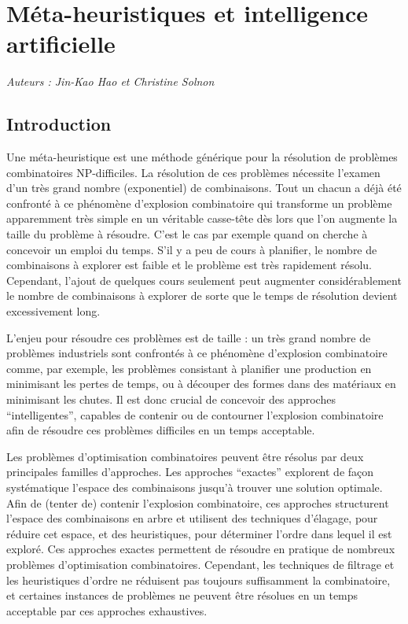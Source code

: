 \documentclass[12pt,a4paper]{book}
\begin{document}
\chapter{Méta-heuristiques et intelligence artificielle}
\textit{Auteurs : Jin-Kao Hao et Christine Solnon}

\section{Introduction}
\label{sec:intro}

Une méta-heuristique est une méthode générique pour la résolution de problèmes combinatoires NP-difficiles. La résolution de ces problèmes nécessite l'examen d'un très grand nombre (exponentiel) de combinaisons. Tout un chacun a déjà été confronté à ce phénomène d'explosion combinatoire qui transforme un problème apparemment très simple en un véritable casse-tête dès lors que l'on augmente la taille du problème à résoudre. C'est le cas par exemple quand on cherche à concevoir un emploi du temps. S'il y a peu de cours à planifier, le nombre de combinaisons à explorer est faible et le problème est très rapidement résolu. Cependant, l'ajout de quelques cours seulement peut augmenter considérablement le nombre de combinaisons à explorer de sorte que le temps de résolution devient excessivement long.

L'enjeu pour résoudre ces problèmes est de taille : un très grand nombre de problèmes industriels sont confrontés à ce phénomène d'explosion combinatoire comme, par exemple, les problèmes consistant à planifier une production en minimisant les pertes de temps, ou à découper des formes dans des matériaux en minimisant les chutes. Il est donc crucial de concevoir des approches ``intelligentes'', capables de contenir ou de contourner l'explosion combinatoire afin de résoudre ces problèmes difficiles en un temps acceptable.

Les problèmes d'optimisation combinatoires peuvent être résolus par deux principales familles d'approches. Les approches ``exactes'' explorent de façon systématique l'espace des combinaisons jusqu'à trouver une solution optimale. Afin de (tenter de) contenir l'explosion combinatoire, ces approches structurent l'espace des combinaisons en arbre et utilisent des techniques d'élagage, pour réduire cet espace, et des heuristiques, pour déterminer l'ordre dans lequel il est exploré. Ces approches exactes permettent de résoudre en pratique de nombreux problèmes d'optimisation combinatoires. Cependant, les techniques de filtrage et les heuristiques d'ordre ne réduisent pas toujours suffisamment la combinatoire, et certaines instances de problèmes ne peuvent être résolues en un temps acceptable par ces approches exhaustives.
\end{document}
